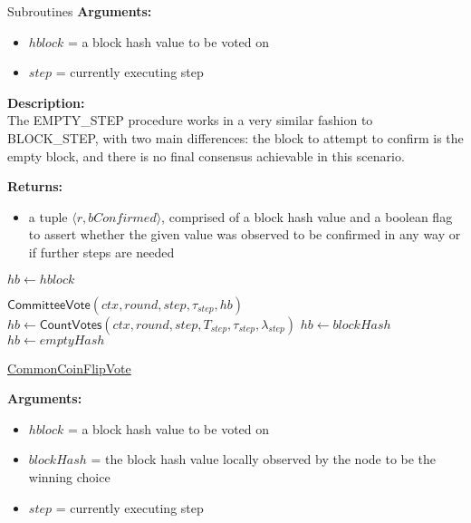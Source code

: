 \documentclass[10pt,a4paper]{article}
\begin{document}
\begin{section}{Subroutines}
\noindent \textbf{Arguments:}
\begin{itemize}
    \item $hblock$ = a block hash value to be voted on
    \item $step$ = currently executing step
  \end{itemize}

\noindent \textbf{Description:}\\
The EMPTY\_STEP procedure works in a very similar fashion to BLOCK\_STEP, 
with two main differences: 
the block to attempt to confirm is the empty block, and there is no final 
consensus achievable in this scenario.

\noindent \textbf{Returns:}
\begin{itemize}
    \item a tuple $\langle r, bConfirmed \rangle$, comprised of a block hash 
    value and a boolean flag to assert whether the given value was
    observed to be confirmed in any way or if further steps are needed
  \end{itemize}


\begin{algorithm}[H]
    \begin{algorithmic}[H]
        \State $hb \gets hblock$
    
        \State $\mathsf{CommitteeVote}(ctx, round, step, \tau_{step}, hb)$
        \State $hb \gets \mathsf{CountVotes}(ctx,round,step,T_{step},\tau_{step},\lambda_{step})$
                \State $hb \gets blockHash$
            \Else
                \State $hb \gets emptyHash$
            \EndIf
        \EndIf
    \EndFunction
    \end{algorithmic}
    \caption{\underline{CommonCoinFlipVote}}
\end{algorithm}

\noindent \textbf{Arguments:}
\begin{itemize}
    \item $hblock$ = a block hash value to be voted on
    \item $blockHash$ = the block hash value locally observed by the node to be the winning choice
    \item $step$ = currently executing step
  \end{itemize}


\end{section}
\end{document}
